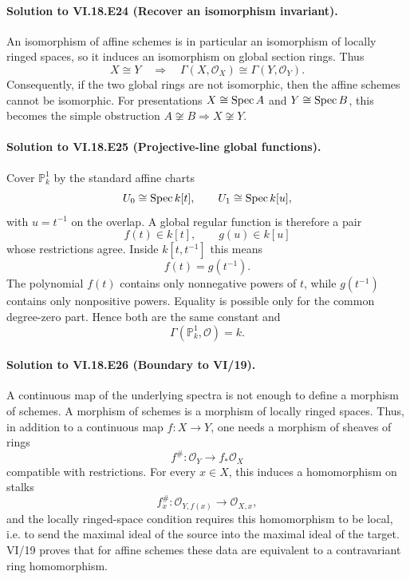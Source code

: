 \paragraph{Solution to VI.18.E24 (Recover an isomorphism invariant).}
\begin{solution}
An isomorphism of affine schemes is in particular an isomorphism of locally ringed spaces, so it induces an isomorphism on global section rings. Thus
\[
X\cong Y\quad\Longrightarrow\quad
\Gamma(X,\mathcal O_X)\cong\Gamma(Y,\mathcal O_Y).
\]
Consequently, if the two global rings are not isomorphic, then the affine schemes cannot be isomorphic. For presentations $X\cong\operatorname{Spec} A$ and $Y\cong\operatorname{Spec} B$, this becomes the simple obstruction $A\not\cong B\Rightarrow X\not\cong Y$.
\end{solution}

\paragraph{Solution to VI.18.E25 (Projective-line global functions).}
\begin{solution}
Cover $\mathbb P^1_k$ by the standard affine charts
\[
U_0\cong\operatorname{Spec} k[t],\qquad U_1\cong\operatorname{Spec} k[u],
\]
with $u=t^{-1}$ on the overlap. A global regular function is therefore a pair
\[
f(t)\in k[t],\qquad g(u)\in k[u]
\]
whose restrictions agree. Inside $k[t,t^{-1}]$ this means
\[
f(t)=g(t^{-1}).
\]
The polynomial $f(t)$ contains only nonnegative powers of $t$, while $g(t^{-1})$ contains only nonpositive powers. Equality is possible only for the common degree-zero part. Hence both are the same constant and
\[
\boxed{\Gamma(\mathbb P^1_k,\mathcal O)=k.}
\]
\end{solution}

\paragraph{Solution to VI.18.E26 (Boundary to VI/19).}
\begin{solution}
A continuous map of the underlying spectra is not enough to define a morphism of schemes. A morphism of schemes is a morphism of locally ringed spaces. Thus, in addition to a continuous map $f:X\to Y$, one needs a morphism of sheaves of rings
\[
f^\#:\mathcal O_Y\longrightarrow f_*\mathcal O_X
\]
compatible with restrictions. For every $x\in X$, this induces a homomorphism on stalks
\[
f_x^\#:\mathcal O_{Y,f(x)}\longrightarrow\mathcal O_{X,x},
\]
and the locally ringed-space condition requires this homomorphism to be local, i.e. to send the maximal ideal of the source into the maximal ideal of the target. VI/19 proves that for affine schemes these data are equivalent to a contravariant ring homomorphism.
\end{solution}
